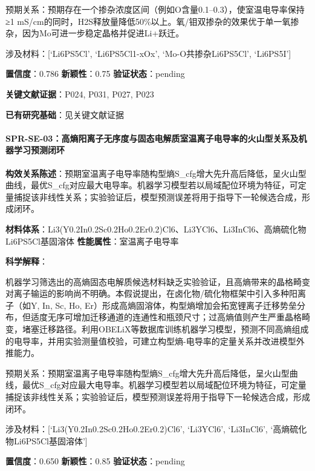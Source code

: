\documentclass[12pt,a4paper]{ctexart}
\begin{document}
预期关系：预期存在一个掺杂浓度区间（例如O含量0.1--0.3），使室温电导率保持≥1 mS/cm的同时，H2S释放量降低50\%以上。氧/钼双掺杂的效果优于单一氧掺杂，因为Mo可进一步稳定晶格并促进Li+跃迁。

涉及材料：{[}`Li6PS5Cl', `Li6PS5Cl1-xOx', `Mo-O共掺杂Li6PS5Cl', `Li6PS5I'{]}

\textbf{置信度}：0.786 \textbar{} \textbf{新颖性}：0.75 \textbar{} \textbf{验证状态}：pending

\textbf{关键文献证据}：P024, P031, P027, P023

\textbf{已有研究基础}：见关键文献证据

\paragraph{SPR-SE-03：高熵阳离子无序度与固态电解质室温离子电导率的火山型关系及机器学习预测闭环}\label{spr-se-03ux9ad8ux71b5ux9633ux79bbux5b50ux65e0ux5e8fux5ea6ux4e0eux56faux6001ux7535ux89e3ux8d28ux5ba4ux6e29ux79bbux5b50ux7535ux5bfcux7387ux7684ux706bux5c71ux578bux5173ux7cfbux53caux673aux5668ux5b66ux4e60ux9884ux6d4bux95edux73af}

\textbf{构效关系陈述}：预期室温离子电导率随构型熵S\_cfg增大先升高后降低，呈火山型曲线，最优S\_cfg对应最大电导率。机器学习模型若以局域配位环境为特征，可定量捕捉该非线性关系；实验验证后，模型预测误差将用于指导下一轮候选合成，形成闭环。

\textbf{材料体系}：Li3(Y0.2In0.2Sc0.2Ho0.2Er0.2)Cl6、Li3YCl6、Li3InCl6、高熵硫化物Li6PS5Cl基固溶体 \textbar{} \textbf{性能属性}：室温离子电导率

\textbf{科学解释}：

机器学习筛选出的高熵固态电解质候选材料缺乏实验验证，且高熵带来的晶格畸变对离子输运的影响尚不明确。本假说提出，在卤化物/硫化物框架中引入多种阳离子（如Y, In, Sc, Ho, Er）形成高熵固溶体，构型熵增加会拓宽锂离子迁移势垒分布，但适度无序可增加迁移通道的连通性和瓶颈尺寸；过高熵值则产生严重晶格畸变，堵塞迁移路径。利用OBELiX等数据库训练机器学习模型，预测不同高熵组成的电导率，并用实验测量值校验，可建立构型熵-电导率的定量关系并改进模型外推能力。

预期关系：预期室温离子电导率随构型熵S\_cfg增大先升高后降低，呈火山型曲线，最优S\_cfg对应最大电导率。机器学习模型若以局域配位环境为特征，可定量捕捉该非线性关系；实验验证后，模型预测误差将用于指导下一轮候选合成，形成闭环。

涉及材料：{[}`Li3(Y0.2In0.2Sc0.2Ho0.2Er0.2)Cl6', `Li3YCl6', `Li3InCl6', `高熵硫化物Li6PS5Cl基固溶体'{]}

\textbf{置信度}：0.650 \textbar{} \textbf{新颖性}：0.85 \textbar{} \textbf{验证状态}：pending
\end{document}
